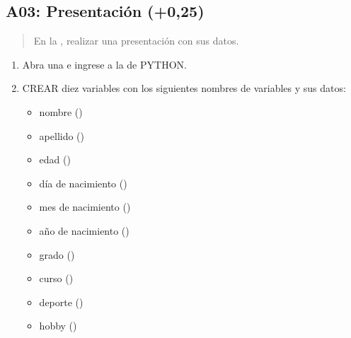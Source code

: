 \documentclass[letterpaper,10pt,spanish]{sphinxmanual}
\begin{document}
\subsection{A03: Presentación (+0,25)}
\label{\detokenize{1_guias/10programacion/G1025:a03-presentacion-0-25}}
\sphinxAtStartPar
{}
\begin{quote}

\sphinxAtStartPar
En la , realizar una presentación con sus datos.
\end{quote}
\begin{enumerate}
%
\item {} 
\sphinxAtStartPar
Abra una  e ingrese a la  de PYTHON.

\item {} 
\sphinxAtStartPar
CREAR diez variables con los siguientes nombres de variables y sus datos:
\begin{itemize}
\item {} 
\sphinxAtStartPar
nombre ()

\item {} 
\sphinxAtStartPar
apellido ()

\item {} 
\sphinxAtStartPar
edad ()

\item {} 
\sphinxAtStartPar
día de nacimiento ()

\item {} 
\sphinxAtStartPar
mes de nacimiento ()

\item {} 
\sphinxAtStartPar
año de nacimiento ()

\item {} 
\sphinxAtStartPar
grado ()

\item {} 
\sphinxAtStartPar
curso ()

\item {} 
\sphinxAtStartPar
deporte ()

\item {} 
\sphinxAtStartPar
hobby ()


\end{itemize}
\end{enumerate}
\end{document}
